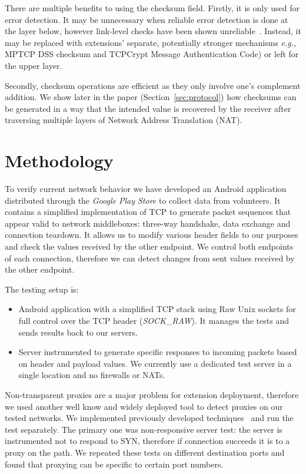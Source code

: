 \documentclass{sig-alternate-10pt}
\providecommand{\eg}{\emph{e.g.,} }
\begin{document}
There are multiple benefits to using the checksum field. Firstly, it is only used for error detection. It may be unnecessary when reliable error detection is done at the layer below, however link-level checks have been shown unreliable~\cite{Stone:2000fc}. Instead, it may be replaced with extensions' separate, potentially stronger mechanisms \eg MPTCP DSS checksum and TCPCrypt Message Authentication Code) or left for the upper layer.

Secondly, checksum operations are efficient as they only involve one's complement addition. We show later in the paper (Section~\ref{sec:protocol}) how checksums can be generated in a way that the intended value is recovered by the receiver after traversing multiple layers of Network Address Translation (NAT).

\section{Methodology}

To verify current network behavior we have developed an Android application distributed through the \emph{Google Play Store} to collect data from volunteers. It contains a simplified implementation of TCP to generate packet sequences that appear valid to network middleboxes: three-way handshake, data exchange and connection teardown. It allows us to modify various header fields to our purposes and check the values received by the other endpoint. We control both endpoints of each connection, therefore we can detect changes from sent values received by the other endpoint.

The testing setup is:
\begin{itemize}
    \item Android application with a simplified TCP stack using Raw Unix sockets for full control over the TCP header (\emph{SOCK\_RAW}). It manages the tests and sends results back to our servers. 
    \item Server instrumented to generate specific responses to incoming packets based on header and payload values. We currently use a dedicated test server in a single location and no firewalls or NATs.
\end{itemize}

Non-transparent proxies are a major problem for extension deployment, therefore we used another well know and widely deployed tool to detect proxies on our tested networks. We implemented previously developed techniques~\cite{Weaver:RHwbx82O} and run the test separately. The primary one was non-responsive server test: the server is instrumented not to respond to SYN, therefore if connection succeeds it is to a proxy on the path. We repeated these tests on different destination ports and found that proxying can be specific to certain port numbers.
\end{document}
